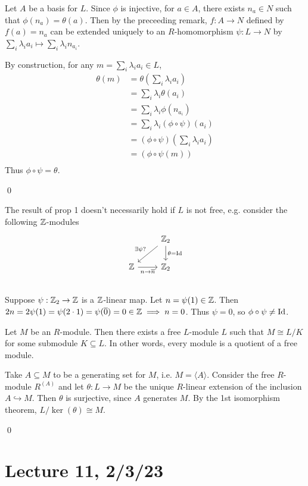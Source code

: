 \documentclass[x11names,reqno,14pt]{extarticle}
\begin{document}
Let $A$ be a basis for $L$. Since $\phi$ is injective, for $a \in A$, there exists $n_a \in N$ such that $\phi(n_a) = \theta(a)$. Then by the preceeding remark, $f:A\to N$ defined by $f(a) = n_a$ can be extended uniquely to an $R$-homomorphism $\psi:L\to N$ by $\sum_i\lambda_ia_i\mapsto \sum_i\lambda_in_{a_i}$.

By construction, for any $m = \sum_i\lambda_ia_i\in L$,
\begin{align*}
\theta(m) & = \theta(\sum_i\lambda_ia_i) \\
			 & = \sum_i\lambda_i\theta(a_i) \\
			 & = \sum_i\lambda_i\phi(n_{a_i}) \\
			 & = \sum_i\lambda_i(\phi\circ\psi)(a_i) \\
			 & = (\phi\circ\psi)(\sum_i\lambda_ia_i) \\
			 & = (\phi\circ\psi(m)) \\
\end{align*}
Thus $\phi\circ\psi = \theta$. 

\qed

\rem

The result of prop 1 doesn't necessarily hold if $L$ is not free, e.g. consider the following $\mathbb{Z}$-modules
\[
\begin{tikzcd}
& \Z_2\ar[ld, "\exists\psi?"'] \ar[d, "\theta = \Id"] \\
\Z\ar[r, "n\to\bar{n}"'] & \Z_2 \\
\end{tikzcd}
\]
Suppose $\psi:\mathbb{Z}_2\to\mathbb{Z}$ is a $\mathbb{Z}$-linear map. Let $n = \psi(1) \in \mathbb{Z}$. Then $2n = 2\psi(1) = \psi(2\cdot 1) = \psi(\overline{0}) = 0\in\mathbb{Z}\implies n = 0$. Thus $\psi = 0$, so $\phi\circ\psi\neq\operatorname{\mathrm{Id}}$. 

\prop

Let $M$ be an $R$-module. Then there exists a free $L$-module $L$ such that $M \cong L/K$ for some submodule $K \subseteq L$. In other words, every module is a quotient of a free module. 

\proof

Take $A \subseteq M$ to be a generating set for $M$, i.e. $M = \langle A \rangle$. Consider the free $R$-module $R^{(A)}$ and let $\theta:L\to M$ be the unique $R$-linear extension of the inclusion $A\hookrightarrow M$. Then $\theta$ is surjective, since $A$ generates $M$. By the 1st isomorphism theorem, $L/\ker(\theta)\cong M$. 

\qed

\section*{Lecture 11, 2/3/23}
\end{document}

